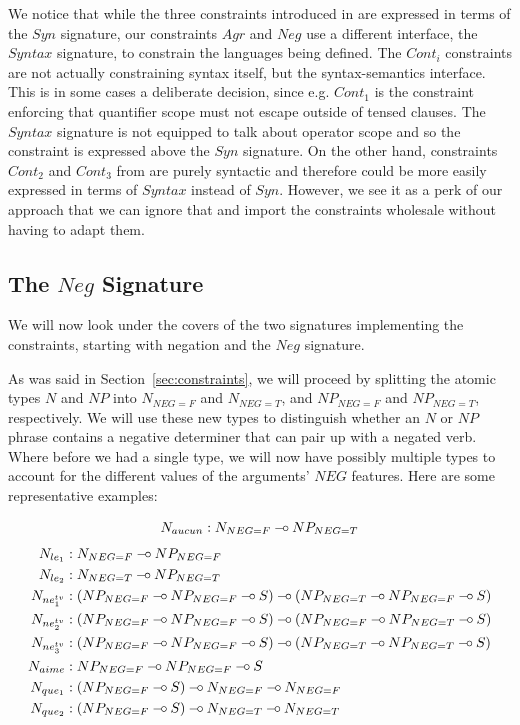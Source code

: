 \documentclass{llncs}
\def\limp {\mathbin{{-}\mkern-3.5mu{\circ}}}
\begin{document}
We notice that while the three constraints introduced in
\cite{pogodalla2012controlling} are expressed in terms of the $Syn$ signature,
our constraints $Agr$ and $Neg$ use a different interface, the $Syntax$
signature, to constrain the languages being defined. The $Cont_i$ constraints
are not actually constraining syntax itself, but the syntax-semantics
interface. This is in some cases a deliberate decision, since e.g. $Cont_1$ is
the constraint enforcing that quantifier scope must not escape outside of
tensed clauses. The $Syntax$ signature is not equipped to talk about operator
scope and so the constraint is expressed above the $Syn$ signature. On the
other hand, constraints $Cont_2$ and $Cont_3$ from
\cite{pogodalla2012controlling} are purely syntactic and therefore could be
more easily expressed in terms of $Syntax$ instead of $Syn$. However, we see
it as a perk of our approach that we can ignore that and import the
constraints wholesale without having to adapt them.

\subsection{The $Neg$ Signature}

We will now look under the covers of the two signatures implementing the
constraints, starting with negation and the $Neg$ signature.

As was said in Section~\ref{sec:constraints}, we will proceed by splitting the
atomic types $N$ and $NP$ into $N_{NEG{=}F}$ and $N_{NEG{=}T}$, and
$NP_{NEG{=}F}$ and $NP_{NEG{=}T}$, respectively. We will use these new types
to distinguish whether an $N$ or $NP$ phrase contains a negative determiner
that can pair up with a negated verb. Where before we had a single type, we
will now have possibly multiple types to account for the different values of
the arguments' $NEG$ features. Here are some representative examples:

\begin{align*}
N_{aucun} &: N_{NEG{=}F} \limp NP_{NEG{=}T} \\
\end{align*} %
\begin{align*}
N_{le_1} &: N_{NEG{=}F} \limp NP_{NEG{=}F} \\
N_{le_2} &: N_{NEG{=}T} \limp NP_{NEG{=}T} \\
N_{ne^{tv}_1} &: (NP_{NEG{=}F} \limp NP_{NEG{=}F} \limp S) \limp (NP_{NEG{=}T} \limp NP_{NEG{=}F} \limp S) \\
N_{ne^{tv}_2} &: (NP_{NEG{=}F} \limp NP_{NEG{=}F} \limp S) \limp (NP_{NEG{=}F}
\limp NP_{NEG{=}T} \limp S) \\
N_{ne^{tv}_3} &: (NP_{NEG{=}F} \limp NP_{NEG{=}F} \limp S) \limp (NP_{NEG{=}T}
\limp NP_{NEG{=}T} \limp S) \\
N_{aime} &: NP_{NEG{=}F} \limp NP_{NEG{=}F} \limp S \\
N_{que_1} &: (NP_{NEG{=}F} \limp S) \limp N_{NEG{=}F} \limp N_{NEG{=}F} \\
N_{que_2} &: (NP_{NEG{=}F} \limp S) \limp N_{NEG{=}T} \limp N_{NEG{=}T} \\
\end{align*}
\end{document}
